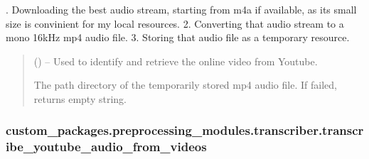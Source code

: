 \documentclass[letterpaper,10pt,english]{sphinxhowto}
\begin{document}
\begin{fulllineitems}
\label{\detokenize{_autosummary/custom_packages.preprocessing_modules.transcriber.process_audio_stream:custom_packages.preprocessing_modules.transcriber.process_audio_stream}}
\pysigstartsignatures
\pysiglinewithargsret
{}
{}
{}
\pysigstopsignatures
{}. Downloading the best audio stream, starting from m4a if available, as its small size
is convinient for my local resources.
2. Converting that audio stream to a mono 16kHz mp4 audio file.
3. Storing that audio file as a temporary resource.
\begin{quote}\begin{description}
\sphinxAtStartPar
{} () – Used to identify and retrieve the online video from Youtube.

\sphinxAtStartPar
The path directory of the temporarily stored mp4 audio file.
If failed, returns empty string.

\sphinxAtStartPar
{}

\end{description}\end{quote}

\end{fulllineitems}


\sphinxstepscope


\subsubsection{custom\_packages.preprocessing\_modules.transcriber.transcribe\_youtube\_audio\_from\_videos}
\label{\detokenize{_autosummary/custom_packages.preprocessing_modules.transcriber.transcribe_youtube_audio_from_videos:custom-packages-preprocessing-modules-transcriber-transcribe-youtube-audio-from-videos}}\label{\detokenize{_autosummary/custom_packages.preprocessing_modules.transcriber.transcribe_youtube_audio_from_videos::doc}}
\end{document}
